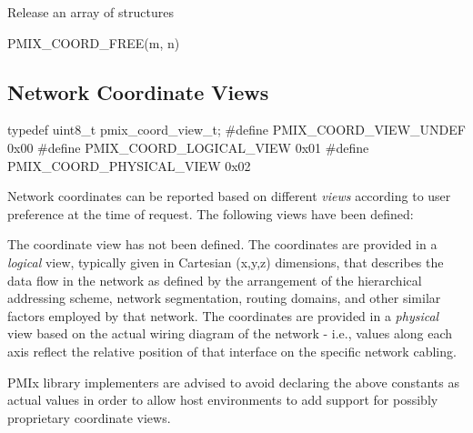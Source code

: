 Release an array of  structures

\cspecificstart
\begin{codepar}
PMIX_COORD_FREE(m, n)
\end{codepar}
\cspecificend

\begin{arglist}
\end{arglist}


\subsection{Network Coordinate Views}

\cspecificstart
\begin{codepar}
typedef uint8_t pmix_coord_view_t;
#define PMIX_COORD_VIEW_UNDEF       0x00
#define PMIX_COORD_LOGICAL_VIEW     0x01
#define PMIX_COORD_PHYSICAL_VIEW    0x02
\end{codepar}
\cspecificend

Network coordinates can be reported based on different \emph{views} according to user preference at the time of request. The following views have been defined:

\begin{constantdesc}
%
The coordinate view has not been defined.
%
The coordinates are provided in a \emph{logical} view, typically given in Cartesian (x,y,z) dimensions, that describes the data flow in the network as defined by the arrangement of the hierarchical addressing scheme, network segmentation, routing domains, and other similar factors employed by that network.
%
The coordinates are provided in a \emph{physical} view based on the actual wiring diagram of the network - i.e., values along each axis reflect the relative position of that interface on the specific network cabling.
%
\end{constantdesc}

\adviceimplstart
\ac{PMIx} library implementers are advised to avoid declaring the above constants as actual  values in order to allow host environments to add support for possibly proprietary coordinate views.
\adviceimplend

